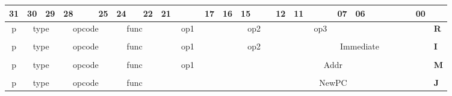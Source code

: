     \begin{table}[h]
        \begin{center}
            \setlength{\tabcolsep}{4pt}
            \small
            \begin{tabular}{c c c c c c c c c c c c c c c c c c c c c c c c c c c c c c c c l}
            31 & 30 & 29 & 28 &
               &    & 25 & 24 &
               & 22 & 21 &    &
               &    & 17 & 16 &
            15 &    &    & 12 &
            11 &    &    &    &
            07 & 06 &    &    &
               &    &    & 00 & \\
            \hline
            \multicolumn{1}{|c|}{p} &
            \multicolumn{2}{c|}{\cellcolor{instgray}type} &
            \multicolumn{4}{c|}{\cellcolor{instgray}opcode} &
            \multicolumn{3}{c|}{\cellcolor{instgray}func} &
            \multicolumn{5}{c|}{\cellcolor{instgray}op1} &
            \multicolumn{5}{c|}{\cellcolor{instgray}op2} &
            \multicolumn{5}{c|}{\cellcolor{instgray}op3} &
            \multicolumn{7}{c|}{} &
            \textbf{R}\\
            \hline
            \\
            \hline
            \multicolumn{1}{|c|}{p} &
            \multicolumn{2}{c|}{\cellcolor{instgray}type} &
            \multicolumn{4}{c|}{\cellcolor{instgray}opcode} &
            \multicolumn{3}{c|}{\cellcolor{instgray}func} &
            \multicolumn{5}{c|}{\cellcolor{instgray}op1} &
            \multicolumn{5}{c|}{\cellcolor{instgray}op2} &
            \multicolumn{12}{c|}{\cellcolor{instgray}Immediate} &
            \textbf{I}\\
            \hline
            \\
            \hline
            \multicolumn{1}{|c|}{p} &
            \multicolumn{2}{c|}{\cellcolor{instgray}type} &
            \multicolumn{4}{c|}{\cellcolor{instgray}opcode} &
            \multicolumn{3}{c|}{\cellcolor{instgray}func} &
            \multicolumn{5}{c|}{\cellcolor{instgray}op1} &
            \multicolumn{1}{c|}{} &
            \multicolumn{16}{c|}{\cellcolor{instgray}Addr} &
            \textbf{M}\\
            \hline
            \\
            \hline
            \multicolumn{1}{|c|}{p} &
            \multicolumn{2}{c|}{\cellcolor{instgray}type} &
            \multicolumn{4}{c|}{\cellcolor{instgray}opcode} &
            \multicolumn{3}{c|}{\cellcolor{instgray}func} &
            \multicolumn{6}{c|}{} &
            \multicolumn{16}{c|}{\cellcolor{instgray}NewPC} &
            \textbf{J}\\
            \hline
            \end{tabular}
        \end{center}
    \end{table}